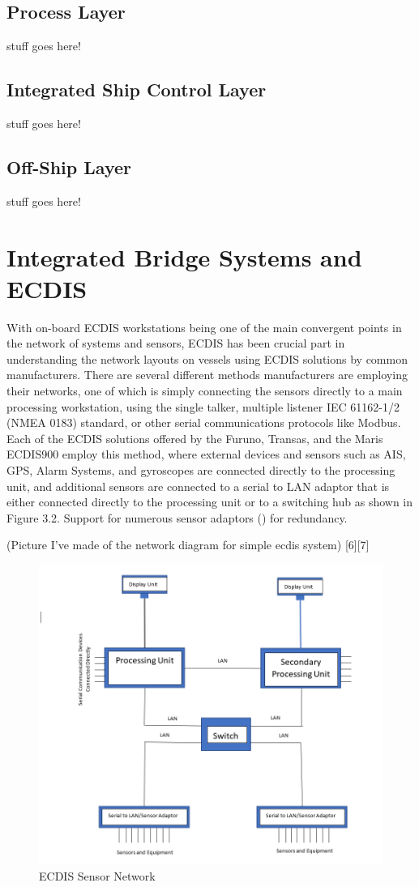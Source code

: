 \documentclass{report}
\begin{document}
\subsection{Process Layer}
stuff goes here!
\subsection{Integrated Ship Control Layer}
stuff goes here!
\subsection{Off-Ship Layer}
stuff goes here!


\section{Integrated Bridge Systems and ECDIS}

With on-board ECDIS workstations being one of the main convergent points in the network of systems and sensors, ECDIS has been crucial part in understanding the network layouts on vessels using ECDIS solutions by common manufacturers. There are several different methods manufacturers are employing their networks, one of which is simply connecting the sensors directly to a main processing workstation, using the single talker, multiple listener IEC 61162-1/2 (NMEA 0183) standard, or other serial communications protocols like Modbus. Each of the ECDIS solutions offered by the Furuno, Transas, and the Maris ECDIS900 employ this method, where external devices and sensors such as AIS, GPS, Alarm Systems, and gyroscopes are connected directly to the processing unit, and additional sensors are connected to a serial to LAN adaptor that is either connected directly to the processing unit or to a switching hub as shown in Figure 3.2. Support for numerous sensor adaptors () for redundancy.

(Picture I've made of the network diagram for simple ecdis system)
[6][7]

\begin{figure}[h]
    \centering
    \includegraphics[width=12cm]{Images and Figures/ECDISsensorNetwork.PNG}
    \caption{ECDIS Sensor Network}
    \label{fig:network}
\end{figure}
\end{document}
